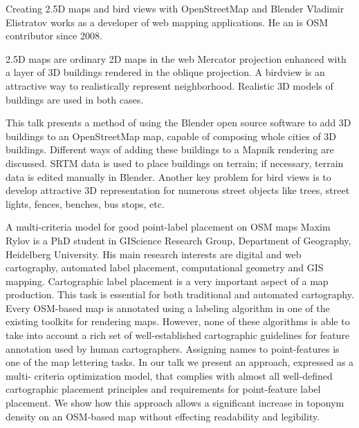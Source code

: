 %
{Creating 2.5D maps and bird views with OpenStreetMap and Blender}%
{Vladimir Elistratov works as a developer of web mapping applications. He an is OSM contributor since 2008. }%
{2.5D maps are ordinary 2D maps in the web Mercator projection enhanced with a layer of 3D buildings rendered in the oblique projection. A birdview is an attractive way to realistically represent neighborhood. Realistic 3D models of buildings are used in both cases.

This talk presents a method of using the Blender open source software to add 3D buildings to an OpenStreetMap map, capable of composing whole cities of 3D buildings. Different ways of adding these buildings to a Mapnik rendering are discussed. SRTM data is used to place buildings on terrain; if necessary, terrain data is edited manually in Blender. Another key problem for bird views is to develop attractive 3D representation for numerous street objects like trees, street lights, fences, benches, bus stops, etc.}

%
{A multi-criteria model for good point-label placement on OSM maps}%
{Maxim Rylov is a PhD student in GIScience Research Group, Department of Geography, Heidelberg University. His main research interests are digital and web cartography, automated label placement, computational geometry and GIS mapping.}%
{Cartographic label placement is a very important aspect of a map production. This task is essential for both traditional and automated cartography. Every OSM-based map is annotated using a labeling algorithm in one of the existing toolkits for rendering maps. However, none of these algorithms is able to take into account a rich set of well-established cartographic guidelines for feature annotation used by human cartographers. Assigning names to point-features is one of the map lettering tasks. In our talk we present an approach, expressed as a multi-
criteria optimization model, that complies with almost all well-defined cartographic placement principles and requirements for point-feature label placement. We show how this approach allows a significant increase in toponym density on an OSM-based map without effecting readability and legibility.}

